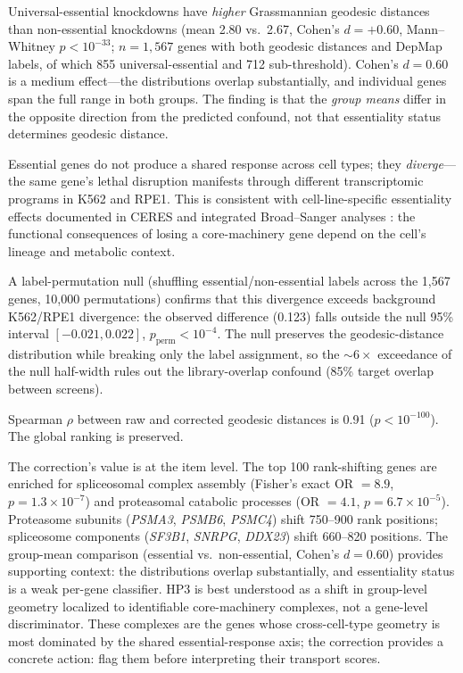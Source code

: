 \documentclass[11pt]{article}
\begin{document}
Universal-essential knockdowns have \emph{higher} Grassmannian geodesic
distances than non-essential knockdowns (mean 2.80 vs.\ 2.67, Cohen's $d =
+0.60$, Mann--Whitney $p < 10^{-33}$; $n = 1{,}567$ genes with both
geodesic distances and DepMap labels, of which 855 universal-essential and
712 sub-threshold). Cohen's $d = 0.60$ is a medium effect---the
distributions overlap substantially, and individual genes span the full
range in both groups. The finding is that the \emph{group means} differ
in the opposite direction from the predicted confound, not that essentiality
status determines geodesic distance.

Essential genes do not produce a shared response across cell types; they
\emph{diverge}---the same gene's lethal disruption manifests through
different transcriptomic programs in K562 and RPE1. This is consistent with cell-line-specific
essentiality effects documented in CERES \citep{meyers2017ceres} and
integrated Broad--Sanger analyses \citep{pacini2021integrated}: the
functional consequences of losing a core-machinery gene depend on
the cell's lineage and metabolic context.

A label-permutation null (shuffling essential/non-essential labels across
the 1{,}567 genes, 10{,}000 permutations) confirms that this divergence
exceeds background K562/RPE1 divergence: the observed difference (0.123)
falls outside the null 95\% interval $[-0.021, 0.022]$,
$p_{\text{perm}} < 10^{-4}$. The null preserves the geodesic-distance
distribution while breaking only the label assignment, so the ${\sim}6\times$
exceedance of the null half-width rules out the library-overlap confound
(85\% target overlap between screens).

Spearman $\rho$ between raw and corrected geodesic distances is 0.91
($p < 10^{-100}$). The global ranking is preserved.

The correction's value is at the item level. The top 100 rank-shifting
genes are enriched for spliceosomal complex assembly (Fisher's exact
OR $= 8.9$, $p = 1.3 \times 10^{-7}$) and proteasomal catabolic
processes (OR $= 4.1$, $p = 6.7 \times 10^{-5}$). Proteasome subunits
(\emph{PSMA3}, \emph{PSMB6}, \emph{PSMC4}) shift 750--900 rank positions;
spliceosome components (\emph{SF3B1}, \emph{SNRPG}, \emph{DDX23}) shift
660--820 positions. The group-mean comparison (essential vs.\ non-essential,
Cohen's $d = 0.60$) provides supporting context: the distributions overlap
substantially, and essentiality status is a weak per-gene classifier.
HP3 is best understood as a shift in group-level geometry localized to
identifiable core-machinery complexes, not a gene-level discriminator.
These complexes are the genes whose cross-cell-type geometry is most
dominated by the shared essential-response axis; the correction provides a
concrete action: flag them before interpreting their transport scores.
\end{document}
